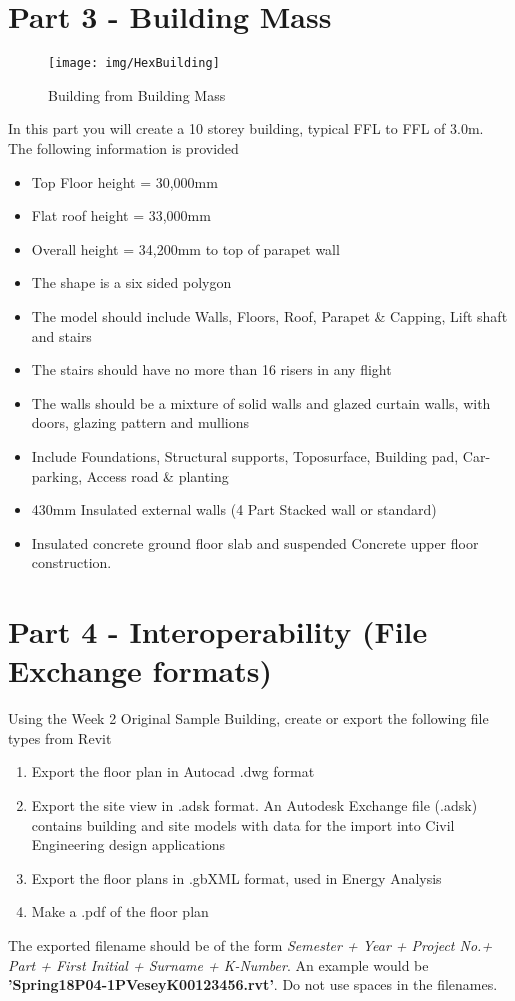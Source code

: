 \newpage

\section*{Part 3 - Building Mass}


\begin{figure}
	\centering
	\texttt{[image: img/HexBuilding]}
	\caption{Building from Building Mass}
	\label{fig:hexbuilding}
\end{figure}



In this part you will create a 10 storey building, typical FFL to FFL of 3.0m. The following information is provided
\begin{itemize}
	\item Top Floor height = 30,000mm
	\item Flat roof height = 33,000mm
	\item Overall height = 34,200mm to top of parapet wall
	\item The shape is a six sided polygon
	\item The model should include Walls, Floors, Roof, Parapet \& Capping, Lift shaft and stairs
	\item The stairs should have no more than 16 risers in any flight
	\item The walls should be a mixture of solid walls and glazed curtain walls, with doors, glazing pattern and mullions
	\item Include Foundations, Structural supports, Toposurface, Building pad, Car-parking, Access road \& planting
	\item 430mm Insulated external walls (4 Part Stacked wall or standard)
	\item Insulated concrete ground floor slab and suspended Concrete upper floor construction.
\end{itemize}



\newpage

\section*{Part 4 - Interoperability (File Exchange formats)}

Using the Week 2 Original Sample Building, create or export the following file types from Revit
\begin{enumerate}
	\item Export the floor plan in Autocad .dwg format
	\item Export the site view in .adsk format.  An Autodesk Exchange file (.adsk) contains building and site models with data for the import into Civil Engineering design applications
	\item Export the floor plans in .gbXML format, used in Energy Analysis
	\item Make a .pdf of the floor plan
\end{enumerate}
The exported filename should be of the form \textit{Semester  + Year + Project No.+ Part + First Initial + Surname + K-Number}. An example would be \textbf{'Spring18P04-1PVeseyK00123456.rvt'}.  Do not use spaces in the filenames.




